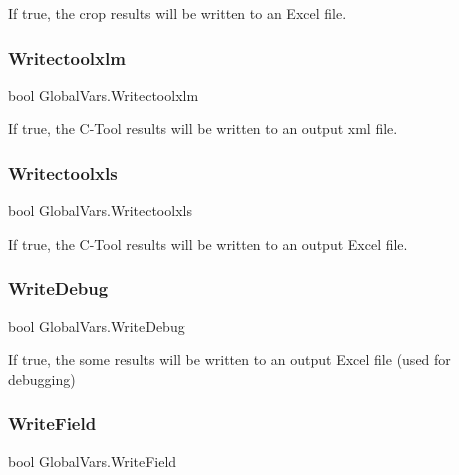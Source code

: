 If true, the crop results will be written to an Excel file. 

\mbox{\label{class_global_vars_a6ff90bb2dc87741b31f307a021fefcda}} 
\subsubsection{\texorpdfstring{Writectoolxlm}{Writectoolxlm}}
{\footnotesize\ttfamily bool Global\+Vars.\+Writectoolxlm}



If true, the C-\/\+Tool results will be written to an output xml file. 

\mbox{\label{class_global_vars_ab53683e6475ea986a6c609b7647f2e66}} 
\subsubsection{\texorpdfstring{Writectoolxls}{Writectoolxls}}
{\footnotesize\ttfamily bool Global\+Vars.\+Writectoolxls}



If true, the C-\/\+Tool results will be written to an output Excel file. 

\mbox{\label{class_global_vars_ab5e94b1f1db204716c7ce560fb63cfd7}} 
\subsubsection{\texorpdfstring{WriteDebug}{WriteDebug}}
{\footnotesize\ttfamily bool Global\+Vars.\+Write\+Debug}



If true, the some results will be written to an output Excel file (used for debugging) 

\mbox{\label{class_global_vars_af83092827619cbb7ed64caf4daee213c}} 
\subsubsection{\texorpdfstring{WriteField}{WriteField}}
{\footnotesize\ttfamily bool Global\+Vars.\+Write\+Field}




